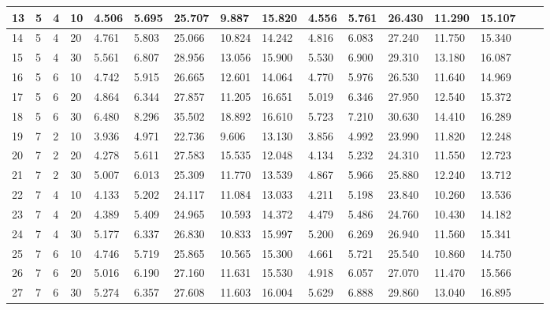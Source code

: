 \documentclass[suppldata]{interact}
\begin{document}
\begin{minipage}{1\textwidth}
\begin{tabular}{|p{1.2em}|p{1.2em}|p{1.2em}|l|l|l|l|l|l|l|l|l|l|l|l|l|}
        13 & 5 & 4 & 10 & 4.506 & 5.695 & 25.707 & 9.887 & 15.820 & 4.556 & 5.761 & 26.430 & 11.290 & 15.107 \\ \hline
        14 & 5 & 4 & 20 & 4.761 & 5.803 & 25.066 & 10.824 & 14.242 & 4.816 & 6.083 & 27.240 & 11.750 & 15.340 \\ \hline
        15 & 5 & 4 & 30 & 5.561 & 6.807 & 28.956 & 13.056 & 15.900 & 5.530 & 6.900 & 29.310 & 13.180 & 16.087 \\ \hline
        16 & 5 & 6 & 10 & 4.742 & 5.915 & 26.665 & 12.601 & 14.064 & 4.770 & 5.976 & 26.530 & 11.640 & 14.969 \\ \hline
        17 & 5 & 6 & 20 & 4.864 & 6.344 & 27.857 & 11.205 & 16.651 & 5.019 & 6.346 & 27.950 & 12.540 & 15.372 \\ \hline
        18 & 5 & 6 & 30 & 6.480 & 8.296 & 35.502 & 18.892 & 16.610 & 5.723 & 7.210 & 30.630 & 14.410 & 16.289 \\ \hline
        19 & 7 & 2 & 10 & 3.936 & 4.971 & 22.736 & 9.606 & 13.130 & 3.856 & 4.992 & 23.990 & 11.820 & 12.248 \\ \hline
        20 & 7 & 2 & 20 & 4.278 & 5.611 & 27.583 & 15.535 & 12.048 & 4.134 & 5.232 & 24.310 & 11.550 & 12.723 \\ \hline
        21 & 7 & 2 & 30 & 5.007 & 6.013 & 25.309 & 11.770 & 13.539 & 4.867 & 5.966 & 25.880 & 12.240 & 13.712 \\ \hline
        22 & 7 & 4 & 10 & 4.133 & 5.202 & 24.117 & 11.084 & 13.033 & 4.211 & 5.198 & 23.840 & 10.260 & 13.536 \\ \hline
        23 & 7 & 4 & 20 & 4.389 & 5.409 & 24.965 & 10.593 & 14.372 & 4.479 & 5.486 & 24.760 & 10.430 & 14.182 \\ \hline
        24 & 7 & 4 & 30 & 5.177 & 6.337 & 26.830 & 10.833 & 15.997 & 5.200 & 6.269 & 26.940 & 11.560 & 15.341 \\ \hline
        25 & 7 & 6 & 10 & 4.746 & 5.719 & 25.865 & 10.565 & 15.300 & 4.661 & 5.721 & 25.540 & 10.860 & 14.750 \\ \hline
        26 & 7 & 6 & 20 & 5.016 & 6.190 & 27.160 & 11.631 & 15.530 & 4.918 & 6.057 & 27.070 & 11.470 & 15.566 \\ \hline
        27 & 7 & 6 & 30 & 5.274 & 6.357 & 27.608 & 11.603 & 16.004 & 5.629 & 6.888 & 29.860 & 13.040 & 16.895 \\ \hline
    \end{tabular}
    \label{tab:output}
    \end{minipage} 
\end{document}
